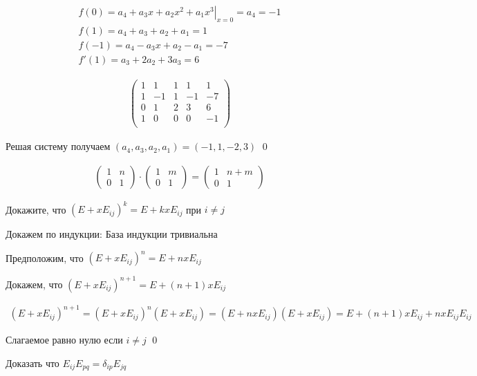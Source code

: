 \begin{sol}
\begin{gather*}
   \left. f(0) = a_4 + a_3 x + a_2 x^2 + a_1 x^3 \right\vert_{x = 0} = a_4 = -1 \\
   f(1) = a_4 + a_3 + a_2 + a_1 = 1 \\
   f(-1) = a_4 - a_3 x + a_2 -  a_1 = -7 \\
   f'(1) =  a_3 + 2 a_2 + 3 a_3  = 6
\end{gather*}

\begin{gather*}
    \left(
    \begin{array}{cccc|c}
     1 & 1 & 1 & 1 & 1 \\
     1 & -1 & 1 & -1 & -7 \\
     0 & 1 & 2 & 3 & 6 \\
     1 & 0 & 0 & 0 & -1 \\
    \end{array}
    \right)
\end{gather*}

Решая систему получаем $\left(a_4, a_3, a_2, a_1\right) = \left(-1, 1, -2, 3\right)$
\qed
\end{sol}

\begin{nb}

\begin{gather*}
    \left(
    \begin{array}{cc}
    1 & n \\
    0 & 1
    \end{array}
    \right)
    \cdot
    \left(
    \begin{array}{cc}
    1 & m \\
    0 & 1
    \end{array}
    \right) =
    \left(
    \begin{array}{cc}
    1 & n + m \\
    0 & 1
    \end{array}
    \right)
\end{gather*}
\end{nb}

\begin{prb}
Докажите, что $\left(E +  x E_{ij}\right)^k = E +  k x E_{ij}$ при $i \neq j$
\end{prb}

\begin{sol}
Докажем по индукции:
База индукции тривиальна

Предположим, что $\left(E +  x E_{ij}\right)^n = E +  n x E_{ij}$

Докажем, что $\left(E +  x E_{ij}\right)^{n + 1} = E +  (n + 1 )x E_{ij}$

\begin{gather*}
    \left(E +  x E_{ij}\right)^{n + 1} = \left(E +  x E_{ij}\right)^{n} \left(E +  x E_{ij}\right) = \left(E +  n x E_{ij}\right) \left(E +  x E_{ij}\right) = E + (n + 1) x E_{ij} + nx E_{ij}E_{ij} 
\end{gather*}

Слагаемое равно нулю если $i \neq j$ \qed

\end{sol}

\begin{prb}
Доказать что $E_{ij}E_{pq} =  \delta_{ip} E_{jq}$
\end{prb}

\begin{sol}

\end{sol}